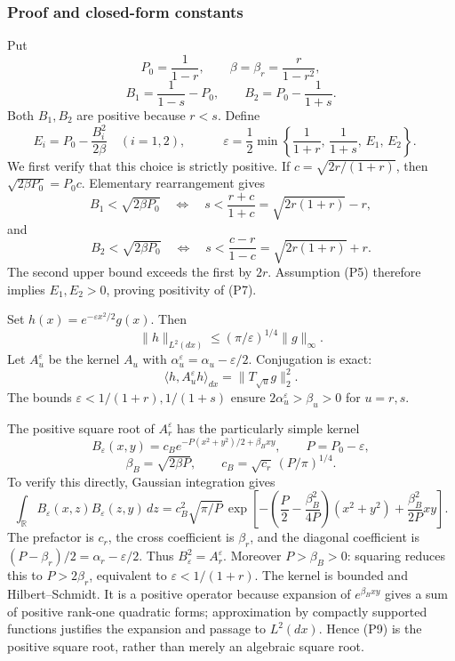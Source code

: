 \documentclass[
  british,
  10pt,
]{article}
\begin{document}
\subsubsection{Proof and closed-form
constants}\label{proof-and-closed-form-constants}

Put \[
P_0=\frac1{1-r},\qquad \beta=\beta_r=\frac r{1-r^2},
\] \[
B_1=\frac1{1-s}-P_0,\qquad
B_2=P_0-\frac1{1+s}.
\] Both \(B_1,B_2\) are positive because \(r<s\). Define \[
E_i=P_0-\frac{B_i^2}{2\beta}\quad(i=1,2),\qquad
\boxed{\quad
\varepsilon=\frac12\min\left\{
\frac1{1+r},\,\frac1{1+s},\,E_1,\,E_2
\right\}.
\quad}                                                   \tag{P7}
\] We first verify that this choice is strictly positive. If
\(c=\sqrt{2r/(1+r)}\), then \(\sqrt{2\beta P_0}=P_0c\). Elementary
rearrangement gives \[
B_1<\sqrt{2\beta P_0}
\quad\Longleftrightarrow\quad
s<\frac{r+c}{1+c}=\sqrt{2r(1+r)}-r,
\] and \[
B_2<\sqrt{2\beta P_0}
\quad\Longleftrightarrow\quad
s<\frac{c-r}{1-c}=\sqrt{2r(1+r)}+r.
\] The second upper bound exceeds the first by \(2r\). Assumption (P5)
therefore implies \(E_1,E_2>0\), proving positivity of (P7).

Set \(h(x)=e^{-\varepsilon x^2/2}g(x)\). Then \[
\|h\|_{L^2(dx)}
\le(\pi/\varepsilon)^{1/4}\|g\|_\infty.
\] Let \(A_u^\varepsilon\) be the kernel \(A_u\) with
\(\alpha_u^\varepsilon=\alpha_u-\varepsilon/2\). Conjugation is exact:
\[
\langle h,A_u^\varepsilon h\rangle_{dx}
=\|T_{\sqrt u}g\|_2^2.                                  \tag{P8}
\] The bounds \(\varepsilon<1/(1+r),1/(1+s)\) ensure
\(2\alpha_u^\varepsilon>\beta_u>0\) for \(u=r,s\).

The positive square root of \(A_r^\varepsilon\) has the particularly
simple kernel \[
B_\varepsilon(x,y)=
c_B e^{-P(x^2+y^2)/2+\beta_Bxy},\qquad
P=P_0-\varepsilon,
\] \[
\beta_B=\sqrt{2\beta P},\qquad
c_B=\sqrt{c_r}\,(P/\pi)^{1/4}.                           \tag{P9}
\] To verify this directly, Gaussian integration gives \[
\int_{\mathbb R}B_\varepsilon(x,z)B_\varepsilon(z,y)\,dz
=c_B^2\sqrt{\pi/P}\,
\exp\left[-\left(\frac P2-\frac{\beta_B^2}{4P}\right)
(x^2+y^2)+\frac{\beta_B^2}{2P}xy\right].
\] The prefactor is \(c_r\), the cross coefficient is \(\beta_r\), and
the diagonal coefficient is \((P-\beta_r)/2=\alpha_r-\varepsilon/2\).
Thus \(B_\varepsilon^2=A_r^\varepsilon\). Moreover \(P>\beta_B>0\):
squaring reduces this to \(P>2\beta_r\), equivalent to
\(\varepsilon<1/(1+r)\). The kernel is bounded and Hilbert--Schmidt. It
is a positive operator because expansion of \(e^{\beta_Bxy}\) gives a
sum of positive rank-one quadratic forms; approximation by compactly
supported functions justifies the expansion and passage to \(L^2(dx)\).
Hence (P9) is the positive square root, rather than merely an algebraic
square root.
\end{document}
